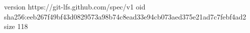 version https://git-lfs.github.com/spec/v1
oid sha256:eeb267f49bf43d0829573a98b74c8ead33e94cb073aed375e21ad7c7febf4ad2
size 118
